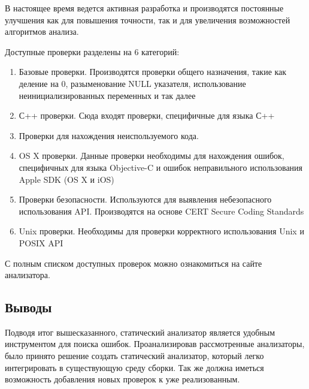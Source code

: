 В настоящее время ведется активная разработка и производятся постоянные улучшения как для повышения точности, 
так и для увеличения возможностей алгоритмов анализа. 

Доступные проверки разделены на 6 категорий: 
\begin{enumerate}
	\item Базовые проверки. Производятся проверки общего назначения, такие как деление на 0, 
разыменование NULL указателя, использование неинициализированных переменных и так далее
	\item С++ проверки. Сюда входят проверки, специфичные для языка С++
	\item Проверки для нахождения неиспользуемого кода.
	\item OS X проверки. Данные проверки необходимы для нахождения ошибок, специфичных для 
языка Objective-C и ошибок неправильного использования Apple SDK (OS X и iOS)
	\item Проверки безопасности. Используются для выявления небезопасного использования API. 
Производятся на основе CERT Secure Coding Standards 
	\item Unix проверки. Необходимы для проверки корректного использования Unix и POSIX API
\end{enumerate}
С полным списком доступных проверок можно ознакомиться на сайте анализатора\cite{clCheck}.

\subsection{Выводы}
Подводя итог вышесказанного, статический анализатор является удобным инструментом для поиска
ошибок. Проанализировав рассмотренные анализаторы, было принято решение создать статический анализатор,
который легко интегрировать в существующую среду сборки. Так же должна иметься возможность добавления новых 
проверок к уже реализованным.
